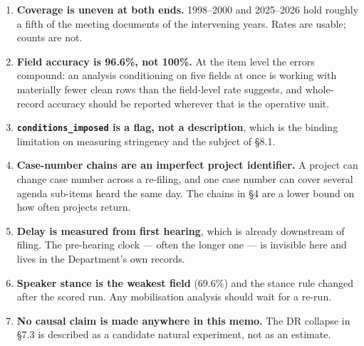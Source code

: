 \documentclass[11pt]{article}
\begin{document}
\begin{enumerate}
\item \textbf{Coverage is uneven at both ends.} 1998--2000 and 2025--2026 hold roughly a fifth
of the meeting documents of the intervening years. Rates are usable; counts are not.
\item \textbf{Field accuracy is 96.6\%, not 100\%.} At the item level the errors compound: an
analysis conditioning on five fields at once is working with materially fewer clean rows than
the field-level rate suggests, and whole-record accuracy should be reported wherever that is
the operative unit.
\item \textbf{\texttt{conditions\_imposed} is a flag, not a description}, which is the binding
limitation on measuring stringency and the subject of \S8.1.
\item \textbf{Case-number chains are an imperfect project identifier.} A project can change
case number across a re-filing, and one case number can cover several agenda sub-items heard
the same day. The chains in \S4 are a lower bound on how often projects return.
\item \textbf{Delay is measured from first hearing}, which is already downstream of filing.
The pre-hearing clock --- often the longer one --- is invisible here and lives in the
Department's own records.
\item \textbf{Speaker stance is the weakest field} (69.6\%) and the stance rule changed after
the scored run. Any mobilisation analysis should wait for a re-run.
\item \textbf{No causal claim is made anywhere in this memo.} The DR collapse in \S7.3 is
described as a candidate natural experiment, not as an estimate.
\end{enumerate}


\end{document}
